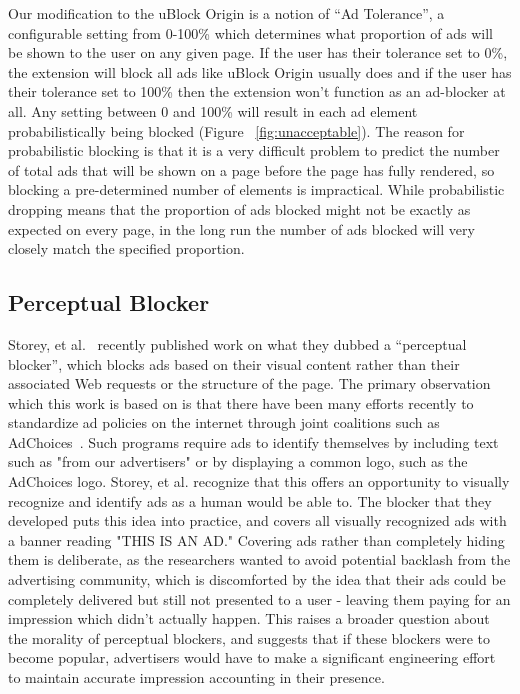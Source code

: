 Our modification to the uBlock Origin is a notion of ``Ad Tolerance'', a configurable setting from 0-100\% which determines what proportion of ads will be shown to the user on any given page.
If the user has their tolerance set to 0\%, the extension will block all ads like uBlock Origin usually does and if the user has their tolerance set to 100\% then the extension won't function as an ad-blocker at all.
Any setting between 0 and 100\% will result in each ad element probabilistically being blocked (Figure ~\ref{fig:unacceptable}).
The reason for probabilistic blocking is that it is a very difficult problem to predict the number of total ads that will be shown on a page before the page has fully rendered, so blocking a pre-determined number of elements is impractical.
While probabilistic dropping means that the proportion of ads blocked might not be exactly as expected on every page, in the long run the number of ads blocked will very closely match the specified proportion.

\subsection{Perceptual Blocker}
Storey, et al.~\cite{storey2016future} recently published work on what they dubbed a ``perceptual blocker'', which blocks ads based on their visual content rather than their associated Web requests or the structure of the page.
The primary observation which this work is based on is that there have been many efforts recently to standardize ad policies on the internet through joint coalitions such as AdChoices~\cite{adchoices}.
Such programs require ads to identify themselves by including text such as "from our advertisers" or by displaying a common logo, such as the AdChoices logo.
Storey, et al. recognize that this offers an opportunity to visually recognize and identify ads as a human would be able to.
The blocker that they developed puts this idea into practice, and covers all visually recognized ads with a banner reading "THIS IS AN AD."
Covering ads rather than completely hiding them is deliberate, as the researchers wanted to avoid potential backlash from the advertising community, which is discomforted by the idea that their ads could be completely delivered but still not presented to a user - leaving them paying for an impression which didn't actually happen.
This raises a broader question about the morality of perceptual blockers, and suggests that if these blockers were to become popular, advertisers would have to make a significant engineering effort to maintain accurate impression accounting in their presence.

